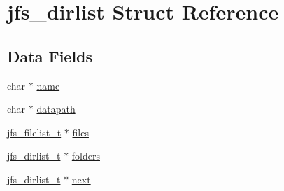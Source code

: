 \hypertarget{structjfs__dirlist}{
\section{jfs\_\-dirlist Struct Reference}
\label{structjfs__dirlist}
}
\subsection*{Data Fields}
\begin{DoxyCompactItemize}
\item 
char $\ast$ \hyperlink{structjfs__dirlist_a16bb2c42c202a1ccf84320dabcf4ce2c}{name}
\item 
char $\ast$ \hyperlink{structjfs__dirlist_afdf5d81463795356cd093961a77d8369}{datapath}
\item 
\hyperlink{structjfs__filelist}{jfs\_\-filelist\_\-t} $\ast$ \hyperlink{structjfs__dirlist_a0f43caa9531a996b79a3cf24dc974e3f}{files}
\item 
\hyperlink{structjfs__dirlist}{jfs\_\-dirlist\_\-t} $\ast$ \hyperlink{structjfs__dirlist_a993b95c955c4f78b0079b2dad962fdc9}{folders}
\item 
\hyperlink{structjfs__dirlist}{jfs\_\-dirlist\_\-t} $\ast$ \hyperlink{structjfs__dirlist_a1a7405b37bae29b98228a7c2a9f11e67}{next}
\end{DoxyCompactItemize}


